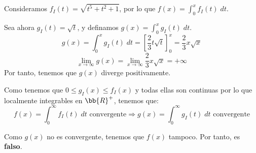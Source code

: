 \documentclass[12pt]{article}
\begin{document}
\begin{ejercicio} 
\begin{enumerate}
        Consideramos $f_I(t)=\sqrt{t^5+t^2+1}$, por lo que $f(x)=\int_0^x f_I(t)\;dt$.

        Sea ahora $g_I(t)=\sqrt{t}$, y definamos $g(x)=\int_0^x g_I(t)\;dt$.
        \begin{equation*}
            g(x) = \int_0^x g_I(t)\;dt = \left[\frac{2}{3}t\sqrt{t}\right]_0^x = \frac{2}{3}x\sqrt{x}
        \end{equation*}
        \begin{equation*}
            \lim_{x\to \infty}g(x)=\lim_{x\to \infty}\frac{2}{3}x\sqrt{x} = +\infty
        \end{equation*}
        Por tanto, tenemos que $g(x)$ diverge positivamente.

        Como tenemos que $0\leq g_I(x)\leq f_I(x)$ y todas ellas son continuas por lo que localmente integrables en $\bb{R}^+$, tenemos que:
        \begin{equation*}
            f(x)=\int_0^\infty f_I(t)\;dt \text{ convergente}
            \Longrightarrow
            g(x)=\int_0^\infty g_I(t)\;dt \text{ convergente}
        \end{equation*}

        Como $g(x)$ no es convergente, tenemos que $f(x)$ tampoco. Por tanto, es \textbf{falso}.
        
    \end{enumerate}    
\end{ejercicio}
\end{document}
